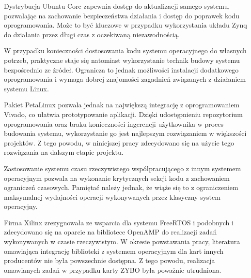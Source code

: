 Dystrybucja Ubuntu Core zapewnia dostęp do aktualizacji samego systemu, pozwalając na zachowanie bezpieczeństwa działania i dostęp do poprawek kodu oprogramowania. 
Może to być kluczowe w przypadku wykorzystania układu Zynq do działania przez długi czas z oczekiwaną niezawodnością. 

W przypadku konieczności dostosowania kodu systemu operacyjnego do własnych potrzeb, praktyczne staje się natomiast wykorzystanie technik budowy systemu bezpośrednio ze źródeł. 
Ogranicza to jednak możliwości instalacji dodatkowego oprogramowania i wymaga dobrej znajomości zagadnień związanych z działaniem systemu Linux.

Pakiet PetaLinux pozwala jednak na największą integrację z oprogramowaniem Vivado, co ułatwia prototypowanie aplikacji. 
Dzięki udostępnieniu repozytorium oprogramowania oraz braku konieczności ingerencji użytkownika w proces budowania systemu, wykorzystanie go jest najlepszym rozwiązaniem w większości projektów. 
Z tego powodu, w niniejszej pracy zdecydowano się na użycie tego rozwiązania na dalszym etapie projektu.

Zastosowanie systemu czasu rzeczywistego współpracującego z innym systemem operacyjnym pozwala na wykonanie krytycznych sekcji kodu z zachowaniem ograniczeń czasowych. Pamiętać należy jednak, że wiąże się to z ograniczeniem maksymalnej wydajności operacji wykonywanych przez klasyczny system operacyjny.

Firma Xilinx zrezygnowała ze wsparcia dla systemu FreeRTOS i podobnych i zdecydowano się na oparcie na bibliotece OpenAMP do realizacji zadań wykonywanych w czasie rzeczywistym. 
W okresie powstawania pracy, literatura omawiająca integrację biblioteki z systemem operacyjnym dla kart innych producentów nie była powszechnie dostępna. 
Z tego powodu, realizacja omawianych zadań w przypadku karty ZYBO była poważnie utrudniona.
